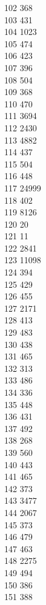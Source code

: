 { 102	368 \\
 103	431 \\
 104	1023 \\
 105	474 \\
 106	423 \\
 107	396 \\
 108	504 \\
 109	368 \\
 110	470 \\
 111	3694 \\
 112	2430 \\
 113	4882 \\
 114	437 \\
 115	504 \\
 116	448 \\
 117	24999 \\
 118	402 \\
 119	8126 \\
 120	20 \\
 121	11 \\
 122	2841 \\
 123	11098 \\
 124	394 \\
 125	429 \\
 126	455 \\
 127	2171 \\
 128	413 \\
 129	483 \\
 130	438 \\
 131	465 \\
 132	313 \\
 133	486 \\
 134	336 \\
 135	448 \\
 136	431 \\
 137	492 \\
 138	268 \\
 139	560 \\
 140	443 \\
 141	465 \\
 142	373 \\
 143	3477 \\
 144	2067 \\
 145	373 \\
 146	479 \\
 147	463 \\
 148	2275 \\
 149	494 \\
 150	386 \\
 151	388 \\
}
